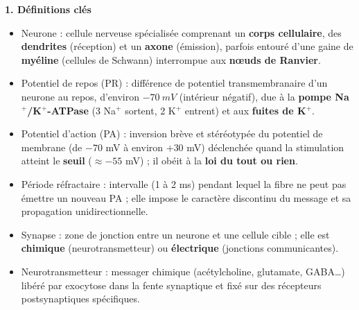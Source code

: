 \documentclass[11pt]{article}
\newcommand{\cle}[1]{{\popxbold\color{popdark}#1}}
\begin{document}
\begin{bilan}
\textbf{1. Définitions clés}
\begin{itemize}
  \item \cle{Neurone} : cellule nerveuse spécialisée comprenant un \textbf{corps cellulaire}, des \textbf{dendrites} (réception) et un \textbf{axone} (émission), parfois entouré d'une gaine de \textbf{myéline} (cellules de Schwann) interrompue aux \textbf{nœuds de Ranvier}.
  \item \cle{Potentiel de repos (PR)} : différence de potentiel transmembranaire d'un neurone au repos, d'environ $\SI{-70}{mV}$ (intérieur négatif), due à la \textbf{pompe Na$^+$/K$^+$-ATPase} (3 Na$^+$ sortent, 2 K$^+$ entrent) et aux \textbf{fuites de K$^+$}.
  \item \cle{Potentiel d'action (PA)} : inversion brève et stéréotypée du potentiel de membrane (de $-70$ mV à environ $+30$ mV) déclenchée quand la stimulation atteint le \textbf{seuil} ($\approx -55$ mV) ; il obéit à la \textbf{loi du tout ou rien}.
  \item \cle{Période réfractaire} : intervalle (1 à 2 ms) pendant lequel la fibre ne peut pas émettre un nouveau PA ; elle impose le caractère discontinu du message et sa propagation unidirectionnelle.
  \item \cle{Synapse} : zone de jonction entre un neurone et une cellule cible ; elle est \textbf{chimique} (neurotransmetteur) ou \textbf{électrique} (jonctions communicantes).
  \item \cle{Neurotransmetteur} : messager chimique (acétylcholine, glutamate, GABA\ldots) libéré par exocytose dans la fente synaptique et fixé sur des récepteurs postsynaptiques spécifiques.
\end{itemize}


\end{bilan}
\end{document}
